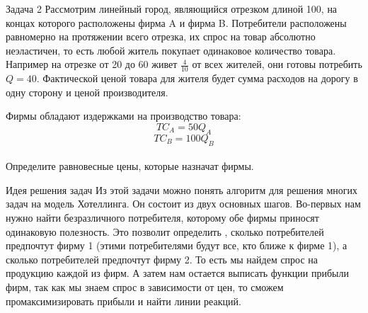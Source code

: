 \begin{mybox}{Задача 2}
    \indent\setlength{\parindent}{1em}\indent\setlength{\parindent}{1em}Рассмотрим линейный город, являющийся отрезком
    длиной 100, на концах которого расположены фирма A и фирма B. Потребители расположены равномерно на протяжении всего
    отрезка, их спрос на товар абсолютно неэластичен, то есть любой житель покупает одинаковое количество товара.
    Например на отрезке от 20 до 60 живет $\frac{4}{10}$ от всех жителей, они готовы потребить $Q=40$. Фактической
    ценой товара для жителя будет сумма расходов на дорогу в одну сторону и ценой производителя.
    \begin{center}
    \end{center}
    \indent\setlength{\parindent}{1em}\indent\setlength{\parindent}{1em}Фирмы обладают издержками на производство
    товара:
    $$TC_A=50Q_A$$ $$TC_B=100Q_B$$\\
    \indent\setlength{\parindent}{1em}Определите равновесные цены, которые назначат фирмы.
\end{mybox}

\begin{mybox}{Идея решения задач}
    Из этой задачи можно понять алгоритм для решения многих задач на модель Хотеллинга. Он состоит из двух основных
    шагов. Во-первых нам
    нужно найти безразличного потребителя, которому обе фирмы приносят одинаковую полезность. Это позволит определить
    , сколько потребителей предпочтут фирму 1 (этими потребителями будут все, кто ближе к фирме 1), а сколько
    потребителей предпочтут фирму 2. То есть мы найдем спрос на продукцию каждой из фирм. А затем нам остается выписать
    функции прибыли фирм, так как мы знаем спрос в зависимости от цен, то сможем промаксимизировать прибыли и найти
    линии реакций.
\end{mybox}

